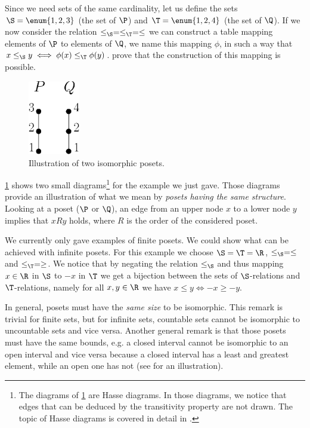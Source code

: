 Since we need sets of the same cardinality, let us define the sets $\S = \enum{1, 2,
3}$ (the set of $\P$) and $\T = \enum{1, 2, 4}$ (the set of $\Q$). If we now consider
the relation $\le_{\S} = \le_{\T} = \le$ we can construct a table mapping elements of
$\P$ to elements of $\Q$, we name this mapping $\phi$, in such a way that $x
\le_{\S} y \iff \phi(x) \le_{\T} \phi(y)$. 
prove that the construction of this mapping is possible.

\begin{figure}
	\centering
	\includegraphics[width=0.2\textwidth]{fig/poset/iso/a}
	\caption{Illustration of two isomorphic posets.}
	\label{fig:poset:iso:a}
\end{figure}

\ref{fig:poset:iso:a} shows two small
diagrams\footnote{The diagrams of \ref{fig:poset:iso:a} are Hasse diagrams. In those diagrams, we
notice that edges that can be deduced by the transitivity property are not
drawn. The topic of Hasse diagrams is covered in detail in
.}
for the example we just gave.
Those diagrams provide an illustration of what we mean by \emph{posets having
the same structure}. Looking at a poset ($\P$ or $\Q$), an edge from an upper
node $x$ to a lower node $y$ implies that $x R y$ holds, where $R$ is the order
of the considered poset.

We currently only gave examples of finite posets. We could show what can be
achieved with infinite posets. For this example we choose $\S = \T = \R$,
$\le_{\S} = \le$ and $\le_{\T} = \ge$. We notice that by negating the relation
$\le_{\S}$ and thus mapping $x \in \R$ in $\S$ to $-x$ in $\T$ we get a
bijection between the sets of $\S$-relations and $\T$-relations, namely for all
$x, y \in \R$ we have $x \le y \iff -x \ge -y$.

In general, posets must have the \emph{same size} to be isomorphic. This remark
is trivial for finite sets, but for infinite sets, countable sets cannot be
isomorphic to uncountable sets and vice versa. Another general remark is that
those posets must have the same bounds, e.g. a closed interval cannot be
isomorphic to an open interval and vice versa because a closed interval has a
least and greatest element, while an open one has not (see
 for an illustration).

